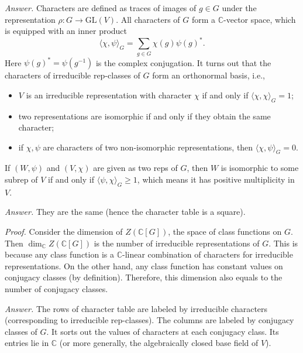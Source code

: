 \documentclass{mathproblems}
\newcommand\C{\mathbb{C}}
\newcommand\GL{\mathrm{GL}}
\begin{document}
\begin{questions}

\textit{Answer.} Characters are defined as traces of images of $g\in G$ under the representation $\rho: G\to \GL(V)$. All characters of $G$ form a $\C$-vector space, which is equipped with an inner product
$$
\langle \chi,\psi \rangle_G=\sum_{g\in G} \chi(g) \psi(g)^*.
$$
Here $\psi(g)^*=\psi(g^{-1})$ is the complex conjugation. It turns out that the characters of irreducible rep-classes of $G$ form an orthonormal basis, i.e.,
\begin{itemize}
    \item $V$ is an irreducible representation with character $\chi$ if and only if $\langle \chi,\chi\rangle_G=1$;
    \item two representations are isomorphic if and only if they obtain the same character;
    \item if $\chi,\psi$ are characters of two non-isomorphic representations, then $\langle\chi,\psi\rangle_G=0$.
\end{itemize}
If $(W,\psi)$ and $(V,\chi)$ are given as two reps of $G$, then $W$ is isomorphic to some subrep of $V$ if and only if $\langle \psi,\chi \rangle_G\geq 1$, which means it has positive multiplicity in $V$.


\textit{Answer.} They are the same (hence the character table is a square).

\textit{Proof.} Consider the dimension of $Z(\C[G])$, the space of class functions on $G$. Then $\dim_{\C} Z(\C[G])$ is the number of irreducible representations of $G$. This is because any class function is a $\C$-linear combination of characters for irreducible representations. On the other hand, any class function has constant values on conjugacy classes (by definition). Therefore, this dimension also equals to the number of conjugacy classes. 


\textit{Answer.} The rows of character table are labeled by irreducible characters (corresponding to irreducible rep-classes). The columns are labeled by conjugacy classes of $G$. It sorts out the values of characters at each conjugacy class. Its entries lie in $\C$ (or more generally, the algebraically closed base field of $V$).


\end{questions}
\end{document}
